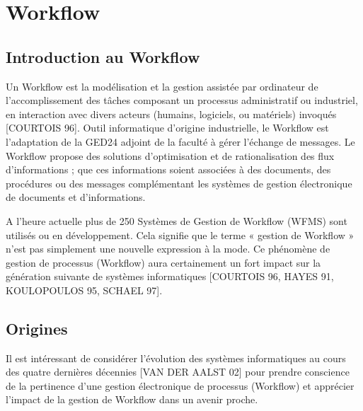  
 

 \section{Workflow}
 	 
 	 \subsection{Introduction au Workflow }
 	 
 	 
 	 Un Workflow est la modélisation et la gestion assistée par ordinateur de l’accomplissement des tâches composant un processus administratif ou industriel, en interaction avec divers acteurs (humains, logiciels, ou matériels) invoqués [COURTOIS 96]. Outil informatique d’origine industrielle, le Workflow est l’adaptation de la GED24 adjoint de la faculté à gérer l’échange de messages. Le Workflow propose des solutions d’optimisation et de rationalisation des flux d’informations ; que ces informations soient associées à des documents, des procédures ou des messages complémentant les systèmes de gestion électronique de documents et d’informations.
 	 
 	 A l’heure actuelle plus de 250 Systèmes de Gestion de Workflow (WFMS) sont utilisés ou en développement. Cela signifie que le terme « gestion de Workflow » n’est pas simplement une nouvelle expression à la mode. Ce phénomène de gestion de processus (Workflow) aura certainement un fort impact sur la génération suivante de systèmes informatiques [COURTOIS 96, HAYES 91, KOULOPOULOS 95, SCHAEL 97].
 	 
 \subsection{Origines} 
 	 Il est intéressant de considérer l’évolution des systèmes informatiques au cours des quatre dernières décennies [VAN DER AALST 02] pour prendre conscience de la pertinence d’une gestion électronique de processus (Workflow) et apprécier l’impact de la gestion de Workflow dans un avenir proche.
 	 
